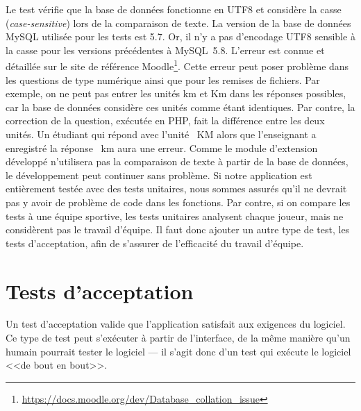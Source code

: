 Le test v\'erifie que la base de donn\'ees fonctionne en UTF8 et consid\`ere la casse (\textit{case-sensitive}) lors de la comparaison de texte.
La version de la base de donn\'ees MySQL utilis\'ee pour les tests est 5.7.
Or, il n'y a pas d'encodage UTF8 sensible \`a la casse pour les versions pr\'ec\'edentes \`a MySQL~5.8.
L'erreur est connue et d\'etaill\'ee sur le site de r\'ef\'erence Moodle\footnote{\url{https://docs.moodle.org/dev/Database_collation_issue}}.
Cette erreur peut poser probl\`eme dans les questions de type num\'erique ainsi que pour les remises de fichiers.
Par exemple, on ne peut pas entrer les unit\'es \og km \fg{} et \og Km \fg{} dans les r\'eponses possibles, car la base de donn\'ees consid\`ere ces unit\'es comme \'etant identiques.
Par contre, la correction de la question, ex\'ecut\'ee en PHP, fait la diff\'erence entre les deux unit\'es.
Un \'etudiant qui r\'epond avec l'unit\'e ~KM \fg{} alors que l'enseignant a enregistr\'e la r\'eponse ~km \fg{} aura une erreur.
Comme le module d'extension d\'evelopp\'e n'utilisera pas la comparaison de texte \`a partir de la base de donn\'ees, le d\'eveloppement peut continuer sans probl\`eme.
Si notre application est enti\`erement test\'ee avec des tests unitaires, nous sommes assur\'es qu'il ne devrait pas y avoir de probl\`eme de code dans les fonctions.
Par contre, si on compare les tests \`a une \'equipe sportive, les tests unitaires analysent chaque joueur, mais ne consid\`erent pas le travail d'\'equipe.
Il faut donc ajouter un autre type de test, les tests d'acceptation, afin de s'assurer de l'efficacit\'e du travail d'\'equipe.
\section{Tests d'acceptation}
Un test d'acceptation valide que l'application satisfait aux exigences du logiciel.
Ce type de test peut s'ex\'ecuter \`a partir de l'interface, de la m\^eme mani\`ere qu'un humain pourrait tester le logiciel --- il s'agit donc d'un test qui ex\'ecute le logiciel <<de bout en bout>>.  \cite{tremblay16}

